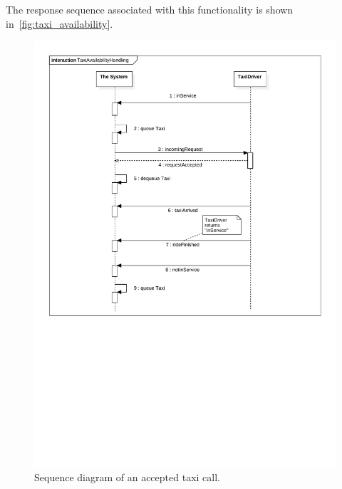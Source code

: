 The response sequence associated with this functionality is shown in~\autoref{fig:taxi_availability}.
\begin{figure}
\includegraphics[width=\textwidth]{diagrams/taxi_availability_handling.pdf}
\caption{Sequence diagram of an accepted taxi call.}
\label{fig:taxi_availability}
\end{figure}

